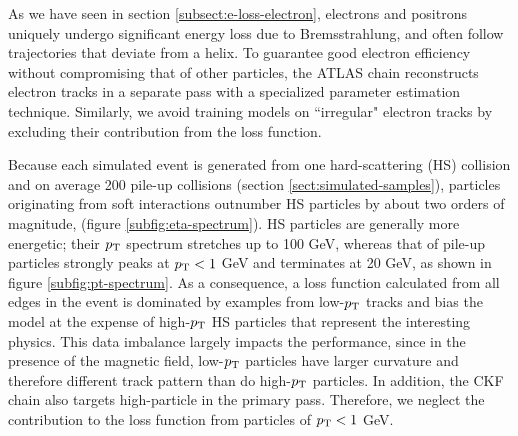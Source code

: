 As we have seen in section \ref{subsect:e-loss-electron}, electrons and positrons uniquely undergo significant energy loss due to Bremsstrahlung, and often follow trajectories that deviate from a helix. 
To guarantee good electron efficiency without compromising that of other particles, the ATLAS chain reconstructs electron tracks in a separate pass with a specialized parameter estimation technique. 
Similarly, we avoid training models on ``irregular" electron tracks by excluding their contribution from the loss function.

Because each simulated event is generated from one hard-scattering (HS) collision and on average 200 pile-up collisions (section \ref{sect:simulated-samples}), particles originating from soft interactions outnumber HS particles by about two orders of magnitude, (figure \ref{subfig:eta-spectrum}). 
HS particles are generally more energetic; their $p_{\text{T}}$ spectrum stretches up to 100 GeV, whereas that of pile-up particles strongly peaks at $p_{\text{T}}<1$ GeV and terminates at 20 GeV, as shown in figure \ref{subfig:pt-spectrum}. 
As a consequence, a loss function calculated from all edges in the event is dominated by examples from low-$p_{\text{T}}$ tracks and bias the model at the expense of high-$p_{\text{T}}$ HS particles that represent the interesting physics.
This data imbalance largely impacts the performance, since in the presence of the magnetic field, low-$p_{\text{T}}$ particles have larger curvature and therefore different track pattern than do high-$p_{\text{T}}$ particles.
In addition, the CKF chain also targets high-\pT particle in the primary pass.
Therefore, we neglect the contribution to the loss function from particles of $p_{\text{T}}<1$ GeV.

